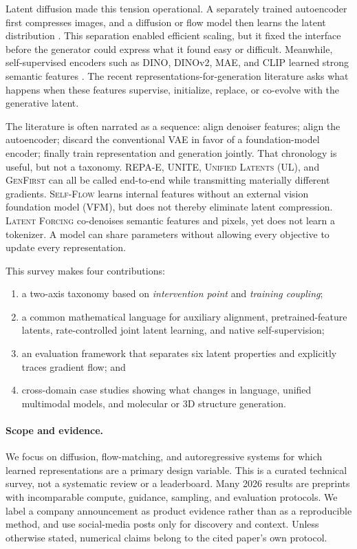\documentclass{article}
\newcommand{\method}[1]{\textsc{#1}}
\begin{document}
Latent diffusion made this tension operational. A separately trained autoencoder first compresses images, and a diffusion or flow model then learns the latent distribution \citep{vahdat2021lsgm,rombach2022ldm}. This separation enabled efficient scaling, but it fixed the interface before the generator could express what it found easy or difficult. Meanwhile, self-supervised encoders such as DINO, DINOv2, MAE, and CLIP learned strong semantic features \citep{caron2021dino,oquab2023dinov2,he2022mae,radford2021clip}. The recent representations-for-generation literature asks what happens when these features supervise, initialize, replace, or co-evolve with the generative latent.

The literature is often narrated as a sequence: align denoiser features; align the autoencoder; discard the conventional VAE in favor of a foundation-model encoder; finally train representation and generation jointly. That chronology is useful, but not a taxonomy. \method{REPA-E}, \method{UNITE}, \method{Unified Latents} (UL), and \method{GenFirst} can all be called end-to-end while transmitting materially different gradients. \method{Self-Flow} learns internal features without an external vision foundation model (VFM), but does not thereby eliminate latent compression. \method{Latent Forcing} co-denoises semantic features and pixels, yet does not learn a tokenizer. A model can share parameters without allowing every objective to update every representation.

This survey makes four contributions:
\begin{enumerate}[leftmargin=*,nosep]
  \item a two-axis taxonomy based on \emph{intervention point} and \emph{training coupling};
  \item a common mathematical language for auxiliary alignment, pretrained-feature latents, rate-controlled joint latent learning, and native self-supervision;
  \item an evaluation framework that separates six latent properties and explicitly traces gradient flow; and
  \item cross-domain case studies showing what changes in language, unified multimodal models, and molecular or 3D structure generation.
\end{enumerate}

\paragraph{Scope and evidence.}
We focus on diffusion, flow-matching, and autoregressive systems for which learned representations are a primary design variable. This is a curated technical survey, not a systematic review or a leaderboard. Many 2026 results are preprints with incomparable compute, guidance, sampling, and evaluation protocols. We label a company announcement as product evidence rather than as a reproducible method, and use social-media posts only for discovery and context. Unless otherwise stated, numerical claims belong to the cited paper's own protocol.
\end{document}
